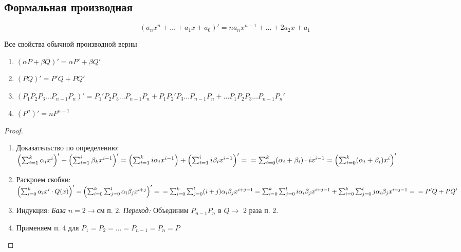\subsection{Формальная производная}
\begin{definition}
    \[(a_nx^n + \dots + a_1x + a_0)' = na_nx^{n-1} + \dots + 2a_2x + a_1\]
\end{definition}
\begin{note}
    Все свойства обычной производной верны
    \begin{enumerate}
        \item \((\alpha P + \beta Q)' = \alpha P' + \beta Q'\)
        \item \((PQ)' = P'Q + PQ'\)
        \item \(\left(P_1 P_2 P_3 \dots P_{n-1} P_n\right)' = P_1' P_2 P_3 \dots P_{n-1} P_n + P_1 P_2' P_3 \dots P_{n-1} P_n + \dots P_1 P_2 P_3 \dots P_{n-1} P_n' \) 
        \item \((P^n)' = nP^{n-1}\)
    \end{enumerate}
    \begin{proof}
        \begin{enumerate}
            \item Доказательство по определению: \\ \(\left(\sum_{i = 1}^k \alpha_i x^i\right)' + \left(\sum_{i = 1}^i \beta_k x^{i - 1}\right)' = \left(\sum_{i = 1}^k i \alpha_i x^{i - 1}\right) + \left(\sum_{i = 1}^i i \beta_i x^{i - 1}\right)' = \\ = \sum_{i = 0}^k (\alpha_i + \beta_i) \cdot i x^{i - 1} = \left(\sum_{i = 0}^k (\alpha_i + \beta_i) x^i\right)'\)
            \item Раскроем скобки:
            \(\left(\sum_{i = 0}^k \alpha_i x^i \cdot Q(x)\right)' = \left(\sum_{i = 0}^k \sum_{j = 0}^l \alpha_i \beta_j x^{i + j}\right)' = \\ = \sum_{i = 0}^k \sum_{j = 0}^l (i + j)\alpha_i \beta_j x^{i + j - 1} = \sum_{i = 0}^k \sum_{j = 0}^l i \alpha_i \beta_j x^{i + j - 1} + \sum_{i = 0}^k \sum_{j = 0}^l j \alpha_i \beta_j x^{i + j - 1} = \\ = P'Q + PQ'\)
            \item Индукция: \textit{База} $n = 2 \to \text{см п. 2}$. \textit{Переход:} Объединим $P_{n-1}P_n$ в $Q \to$ 2 раза п. 2.
            \item Применяем п. 4 для $P_1 = P_2 = \dots = P_{n-1} = P_n = P$
        \end{enumerate}
    \end{proof}
\end{note}